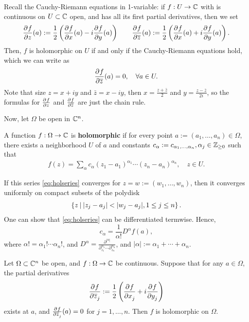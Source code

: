 \documentclass[11pt]{article}
\begin{document}
Recall the Cauchy-Riemann equations in 1-variable: if $f:U \to \C$ with is continuous on $U \subset \C$ open, and has all its first partial derivatives, then we set
$$\partder[]{f}{z}(a):=\frac{1}{2}\paren{\partder{f}{x}(a)-i\partder{f}{y}(a)} \quad \quad \partder{f}{\bar z}(a):= \frac{1}{2}\paren{\partder{f}{x}(a) +i\partder{f}{y}(a)}.$$
Then, $f$ is holomorphic on $U$ if and only if the Cauchy-Riemann equations hold, which we can write as
$$\partder{f}{\bar z}(a)=0, \quad \forall a \in U.$$
Note that size $z=x+iy$ and $\bar z=x-iy$, then $x=\frac{z+\bar z}{2}$ and $y=\frac{z-\bar z}{2i}$, so the formulas for $\partder{f}{z}$ and $\partder{f}{\bar z}$ are just the chain rule.

Now, let $\Omega$ be open in $\C^n$.
\begin{defn}
    A function $f:\Omega \to \C$ is \textbf{holomorphic} if for every point $a:=(a_1,\dots,a_n) \in \Omega$, there exists a neighborhood $U$ of $a$ and constants $c_\alpha:=c_{\alpha_1,\dots,\alpha_n}, \alpha_j \in \Z_{\geq 0}$ such that
    \begin{align} \label{eq:holseries}
        f(z) = \sum_{\alpha}c_\alpha(z_1-a_1)^{\alpha_1}\cdots (z_n-a_n)^{\alpha_n}, \quad z \in U.
    \end{align}
\end{defn}

If this series \eqref{eq:holseries} converges for $z=w:=(w_1,\dots,w_n)$, then it converges uniformly on compact subsets of the polydisk
    $$\brax{z \setbar |z_j-a_j|<|w_j-a_j|,1\leq j \leq n}.$$
One can show that \eqref{eq:holseries} can be differentiated termwise. Hence,
$$c_\alpha = \frac{1}{\alpha!}D^\alpha f(a),$$
where $\alpha! = \alpha_1!\cdots \alpha_n!$, and $D^\alpha =\frac{\partial^{|\alpha |}}{\partial_{z_1}^{\alpha_1}\cdots \partial_{z_n}^{\alpha_n}}$, and $|\alpha|:=\alpha_1+\cdots +\alpha _n$.

\begin{thm}
    Let $\Omega \subset \C^n$ be open, and $f:\Omega \to \C$ be continuous. Suppose that for any $a \in \Omega$, the partial derivatives
    $$\partder{f}{\bar z_j}:=\frac{1}{2}\paren{\partder{f}{x_j}+i\partder{f}{y_j}}$$
    exists at $a$, and $\partder{f}{\bar z_j}(a)=0$ for $j=1,\dots,n$. Then $f$ is holomorphic on $\Omega$.
\end{thm}
\end{document}
